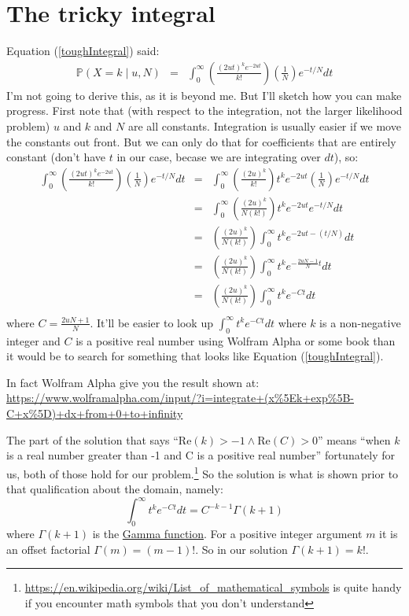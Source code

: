 \documentclass[11pt]{article}
\renewcommand{\Pr}{\mathbb{P}}
\newcommand{\href}[2]{\url{#2}}
\begin{document}
\section{The tricky integral}
\label{deriveTheta}
Equation (\ref{toughIntegral}) said:
\begin{eqnarray*}\Pr(X=k \mid u, N) & = & \int_{0}^{\infty} \left(\frac{(2ut)^k e^{-2ut}}{k!} \right)\left(\frac{1}{N}\right) e^{-t/N}dt
\end{eqnarray*}
I'm not going to derive this, as it is beyond me.
But I'll sketch how you can make progress.
First note that (with respect to the integration, not the larger likelihood problem)
$u$ and $k$ and $N$ are all constants.
Integration is usually easier if we move the constants out front.
But we can only do that for coefficients that are entirely constant (don't have $t$ 
in our case, becase we are integrating over $dt$), so:
\begin{eqnarray*}
\int_{0}^{\infty} \left(\frac{(2ut)^k e^{-2ut}}{k!} \right)\left(\frac{1}{N}\right) e^{-t/N}dt 
& = & \int_{0}^{\infty} \left(\frac{(2u)^k}{k!}\right) t^ke^{-2ut} \left(\frac{1}{N}\right) e^{-t/N} dt \\
& = & \int_{0}^{\infty} \left(\frac{(2u)^k}{N(k!)}\right) t^ke^{-2ut} e^{-t/N} dt \\
& = & \left(\frac{(2u)^k}{N(k!)}\right) \int_{0}^{\infty}  t^ke^{-2ut - (t/N)} dt \\
& = & \left(\frac{(2u)^k}{N(k!)}\right) \int_{0}^{\infty}  t^ke^{-\frac{2uN - 1}{N} t} dt \\
& = & \left(\frac{(2u)^k}{N(k!)}\right) \int_{0}^{\infty}  t^ke^{-C t} dt \\
\end{eqnarray*}
where $C=\frac{2uN + 1}{N}$.
It'll be easier to look up $ \int_{0}^{\infty}  t^ke^{-C t} dt$ where $k$ is a non-negative
integer and $C$ is a positive real number using Wolfram Alpha or some book than it would be
to search for something that looks like Equation (\ref{toughIntegral}).

In fact Wolfram Alpha give you the result shown at:
\url{https://www.wolframalpha.com/input/?i=integrate+(x%5Ek+exp%5B-C+x%5D)+dx+from+0+to+infinity}

The part of the solution that says ``$\mbox{Re}(k) > - 1 \land \mbox{Re}(C) > 0$''
means ``when $k$ is a real number greater than -1 and C is a positive real number''
fortunately for us, both of those hold for our problem.\footnote{\url{https://en.wikipedia.org/wiki/List_of_mathematical_symbols} is quite handy if you encounter math symbols that you don't understand}
So the solution is what is shown prior to that qualification about the domain, namely:
$$ \int_{0}^{\infty}  t^ke^{-C t} dt = C^{-k-1}\Gamma(k+1)$$
where $\Gamma(k+1)$ is the \href{https://en.wikipedia.org/wiki/Gamma_function}{Gamma function}.
For a positive integer argument $m$ it is an offset factorial $\Gamma(m) = (m-1)!$.
So in our solution $\Gamma(k+1) = k!$.
\end{document}
